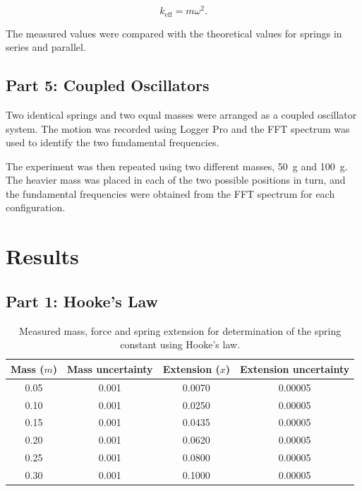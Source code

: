 \documentclass[12pt,a4paper]{article}
\begin{document}
\begin{equation}
k_{\mathrm{eff}}=m\omega^2.
\end{equation}

The measured values were compared with the theoretical values for springs in series and parallel.

\subsection{Part 5: Coupled Oscillators}

Two identical springs and two equal masses were arranged as a coupled oscillator system. The motion was recorded using Logger Pro and the FFT spectrum was used to identify the two fundamental frequencies.

The experiment was then repeated using two different masses, \SI{50}{g} and \SI{100}{g}. The heavier mass was placed in each of the two possible positions in turn, and the fundamental frequencies were obtained from the FFT spectrum for each configuration.

\newpage

\section{Results}

\subsection{Part 1: Hooke's Law}

\begin{table}[H]
\centering
\caption{Measured mass, force and spring extension for determination of the spring constant using Hooke's law.}
\begin{tabular}{cccc}
\toprule
Mass ($m$) & Mass uncertainty & Extension ($x$) & Extension uncertainty \\
\midrule
0.05 & 0.001 & 0.0070 & 0.00005 \\
0.10 & 0.001 & 0.0250 & 0.00005 \\
0.15 & 0.001 & 0.0435 & 0.00005 \\
0.20 & 0.001 & 0.0620 & 0.00005 \\
0.25 & 0.001 & 0.0800 & 0.00005 \\
0.30 & 0.001 & 0.1000 & 0.00005 \\
\bottomrule
\end{tabular}
\end{table}
\end{document}
